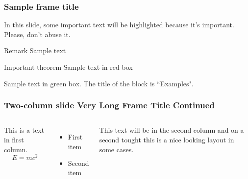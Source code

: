 \documentclass[aspectratio=1610]{beamer}
\begin{document}
\begin{frame}
\frametitle{Sample frame title}

In this slide, some important text will be
\alert{highlighted} because it's important.
Please, don't abuse it.

\begin{block}{Remark}
Sample text
\end{block}

\begin{alertblock}{Important theorem}
Sample text in red box
\end{alertblock}

\begin{examples}
Sample text in green box. The title of the block is ``Examples".
\end{examples}
\end{frame}


\begin{frame}
\frametitle{Two-column slide Very Long Frame Title Continued}

\begin{columns}

This is a text in first column.
$$E=mc^2$$
\begin{itemize}
\item First item
\item Second item
\end{itemize}

This text will be in the second column
and on a second tought this is a nice looking
layout in some cases.
\end{columns}
\end{frame}
\end{document}

